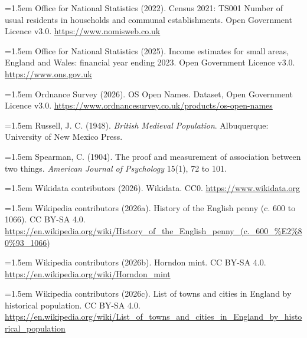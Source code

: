 \documentclass[11pt,a4paper]{article}
\begin{document}
\hangindent=1.5em Office for National Statistics (2022). Census 2021: TS001 Number of usual residents in households and communal establishments. Open Government Licence v3.0. \url{https://www.nomisweb.co.uk}

\hangindent=1.5em Office for National Statistics (2025). Income estimates for small areas, England and Wales: financial year ending 2023. Open Government Licence v3.0. \url{https://www.ons.gov.uk}

\hangindent=1.5em Ordnance Survey (2026). OS Open Names. Dataset, Open Government Licence v3.0. \url{https://www.ordnancesurvey.co.uk/products/os-open-names}

\hangindent=1.5em Russell, J. C. (1948). \textit{British Medieval Population}. Albuquerque: University of New Mexico Press.

\hangindent=1.5em Spearman, C. (1904). The proof and measurement of association between two things. \textit{American Journal of Psychology} 15(1), 72 to 101.

\hangindent=1.5em Wikidata contributors (2026). Wikidata. CC0. \url{https://www.wikidata.org}

\hangindent=1.5em Wikipedia contributors (2026a). History of the English penny (c. 600 to 1066). CC BY-SA 4.0. \url{https://en.wikipedia.org/wiki/History_of_the_English_penny_(c._600_\%E2\%80\%93_1066)}

\hangindent=1.5em Wikipedia contributors (2026b). Horndon mint. CC BY-SA 4.0. \url{https://en.wikipedia.org/wiki/Horndon_mint}

\hangindent=1.5em Wikipedia contributors (2026c). List of towns and cities in England by historical population. CC BY-SA 4.0. \url{https://en.wikipedia.org/wiki/List_of_towns_and_cities_in_England_by_historical_population}
\end{document}
